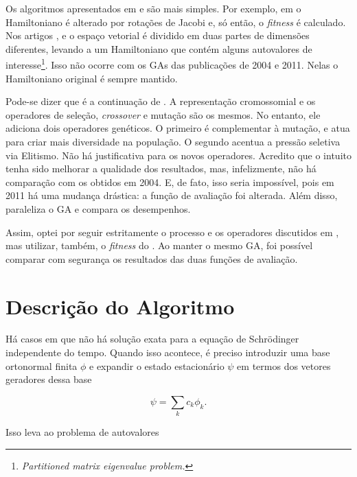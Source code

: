 	Os algoritmos apresentados em \cite{metodo2004} e \cite{metodo2011} são mais simples. Por exemplo, em \cite{metodo2002} o Hamiltoniano é alterado por rotações de Jacobi e, só então, o \emph{fitness} é calculado. Nos artigos \cite{metodo2006}, \cite{metodo2008} e \cite{metodo2009} o espaço vetorial é dividido em duas partes de dimensões diferentes, levando a um Hamiltoniano que contém alguns autovalores de interesse\footnote{\emph{Partitioned matrix eigenvalue problem.}}. Isso não ocorre com os GAs das publicações de 2004 e 2011. Nelas o Hamiltoniano original é sempre mantido.
	
	Pode-se dizer que \cite{metodo2011} é a continuação de \cite{metodo2004}. A representação cromossomial e os operadores de seleção, \emph{crossover} e mutação são os mesmos. No entanto, ele adiciona dois operadores genéticos. O primeiro é complementar à mutação, e atua para criar mais diversidade na população. O segundo acentua a pressão seletiva via Elitismo. Não há justificativa para os novos operadores. Acredito que o intuito tenha sido melhorar a qualidade dos resultados, mas, infelizmente, não há comparação com os obtidos em 2004. E, de fato, isso seria impossível, pois em 2011 há uma mudança drástica: a função de avaliação foi alterada. Além disso, \cite{metodo2011} paraleliza o GA e compara os desempenhos.
	
	Assim, optei por seguir estritamente o processo e os operadores discutidos em \cite{metodo2004}, mas utilizar, também, o \emph{fitness} do \cite{metodo2011}. Ao manter o mesmo GA, foi possível comparar com segurança os resultados das duas funções de avaliação.

\section{Descrição do Algoritmo}

	Há casos em que não há solução exata para a equação de Schrödinger independente do tempo. Quando isso acontece, é preciso introduzir uma base ortonormal finita {$\phi$} e expandir o estado estacionário $\psi$ em termos dos vetores geradores dessa base
	
	\begin{equation}
		\psi = \sum_k c_k \phi_k.
	\end{equation}
	
	Isso leva ao problema de autovalores
	
